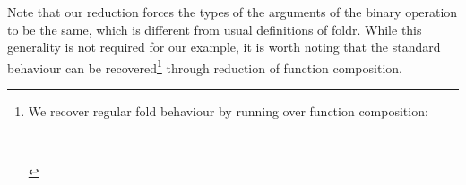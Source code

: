 Note that our reduction forces the types of the arguments of the binary
operation to be the same, which is different from usual definitions of foldr.
While this generality is not required for our example,
it is worth noting that the standard behaviour can be recovered\footnote{
We recover regular fold behaviour by running  over function composition:
\begin{code}%
%
\>[2]\AgdaSpace{}%
\AgdaSymbol{:}\AgdaSpace{}%
\AgdaSymbol{(}\AgdaSpace{}%
\AgdaSpace{}%
\AgdaSpace{}%
\AgdaSpace{}%
\AgdaSymbol{)}\AgdaSpace{}%
\AgdaSpace{}%
\AgdaSpace{}%
\AgdaSpace{}%
\AgdaSpace{}%
\AgdaSpace{}%
\AgdaSpace{}%
\AgdaSpace{}%
\<%
\\
%
\>[2]\AgdaSpace{}%
\AgdaSpace{}%
\AgdaSpace{}%
\AgdaSpace{}%
\AgdaSymbol{=}\AgdaSpace{}%
\AgdaSpace{}%
\AgdaSpace{}%
\AgdaSpace{}%
\AgdaSymbol{(}\AgdaSpace{}%
\AgdaSpace{}%
\AgdaSymbol{)}\AgdaSpace{}%
\<%
\end{code}
} through reduction of function composition.

